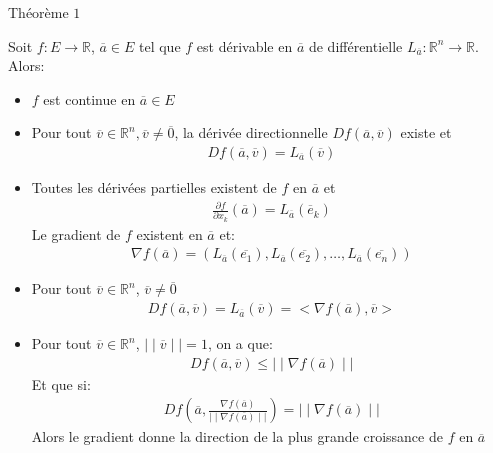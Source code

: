 \begin{parag}{Théorème $1$}

    \begin{theoreme}
        Soit $f: E \to \mathbb{R}$, $ \overline{a} \in E$ tel que $f$ est dérivable en $ \overline{a}$ de différentielle $L_{ \overline{a}}: \mathbb{R}^n \to \mathbb{R}$. Alors:
        \begin{itemize}
            \item $f$ est continue en  $\overline{a} \in E$
            \item Pour tout $\overline{v} \in \mathbb{R}^n , \overline{v} \neq \overline{0}$, la dérivée directionnelle $Df( \overline{a}, \overline{v})$ existe et 
                \begin{align*}
                    Df( \overline{a}, \overline{v}) = L_{ \overline{a}}( \overline{v})
               \end{align*}
           \item Toutes les dérivées partielles existent de $f$ en $\overline{a}$ et
               \begin{align*}
                   \frac{\partial f}{\partial x_k}( \overline{a}) = L_{ \overline{a}}( \overline{e}_k)
               \end{align*}
               Le gradient de $f$ existent en $ \overline{a}$ et:
               \begin{align*}
                   \nabla f( \overline{a}) = \left( L_{ \overline{a}}( \overline{e_1}),  L_{ \overline{a}}( \overline{e_2}), \dots,  L_{ \overline{a}}( \overline{e_n}) \right)
               \end{align*}
           \item Pour tout $\overline{v} \in \mathbb{R}^n $, $ \overline{v} \neq \overline{0}$
               \begin{align*}
                   Df( \overline{a}, \overline{v}) = L_{ \overline{a}}( \overline{v}) = < \nabla f( \overline{a}), \overline{v}>
               \end{align*}
           \item Pour tout $ \overline{v} \in \mathbb{R}^n $, $ \mid \mid \overline{v} \mid \mid = 1$, on a que:
               \begin{align*}
                   Df( \overline{a}, \overline{v}) \leq \mid \mid \nabla f( \overline{a}) \mid \mid
               \end{align*}
               Et que si:
               \begin{align*}
                   Df \left( \overline{a}, \frac{\nabla f( \overline{a})}{ \mid \mid \nabla f( \overline{a}) \mid \mid} \right)= \mid \mid \nabla f( \overline{a}) \mid \mid
               \end{align*}
              Alors le gradient donne la direction de la plus grande croissance de $f$ en $\overline{a}$ 
        \end{itemize}

    \end{theoreme}
    
\end{parag}

